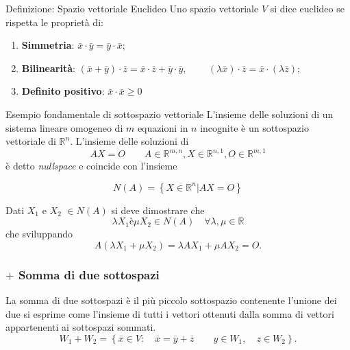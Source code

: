 \documentclass[x11names]{article}
\begin{document}
	\begin{center}
	\colorbox{myblue}{\begin{minipage}{5.75in}
			\begin{blues}{Definizione: Spazio vettoriale Euclideo}
				Uno spazio vettoriale $V$ si dice euclideo se rispetta le proprietà di:
				\begin{enumerate}
					\item \textbf{Simmetria}: $\bar{x} \cdot \bar{y} = \bar{y} \cdot \bar{x}$;
					\item \textbf{Bilinearità}: $\left(\bar{x} + \bar{y}\right) \cdot \bar{z} = \bar{x} \cdot \bar{z} + \bar{y} \cdot \bar{y}$, $\qquad \left(\lambda \bar{x}\right) \cdot \bar{z} = \bar{x} \cdot \left(\lambda \bar{z}\right)$;
					\item \textbf{Definito positivo}: $\bar{x} \cdot \bar{x} \geq 0$
				\end{enumerate}
			\end{blues}
	\end{minipage}}       
\end{center}

\begin{es}{Esempio fondamentale di sottospazio vettoriale}
L'insieme delle soluzioni di un sistema lineare omogeneo di $m$ equazioni in $n$ incognite è un sottospazio vettoriale di $\mathbb{R}^n$. L'insieme delle soluzioni di 
\[
AX = O \qquad A \in \mathbb{R}^{m,n}, X \in \mathbb{R}^{n,1}, O \in \mathbb{R}^{m,1}
\] 
è detto \textit{nullspace} e coincide con l'insieme

\[
N\left(A\right) = \left\{ X \in \mathbb{R}^n | AX = O  \right\}
\]

Dati $X_1$ e $X_2$ $\in N\left(A\right)$ si deve dimostrare che 
\[
\lambda X_1 è \mu X_2 \in N\left(A\right) \quad \forall \lambda,\mu \in \mathbb{R}
\] 
che sviluppando
\[
A\left(\lambda X_1 + \mu X_2\right) = \lambda AX_1 + \mu AX_2 = O
.\] 
\end{es}


\subsubsection{$+$ Somma di due sottospazi}
La somma di due sottospazi è il più piccolo sottospazio contenente l'unione dei due si esprime come l'insieme di tutti i vettori ottenuti dalla somma di vettori appartenenti ai sottospazi sommati.
\[
W_1 + W_2  = \left\{\overline{x} \in V: \quad \overline{x} = \overline{y}+\overline{z}  \qquad y \in W_1, \quad z \in W_2\right\}
.\] 
\end{document}
